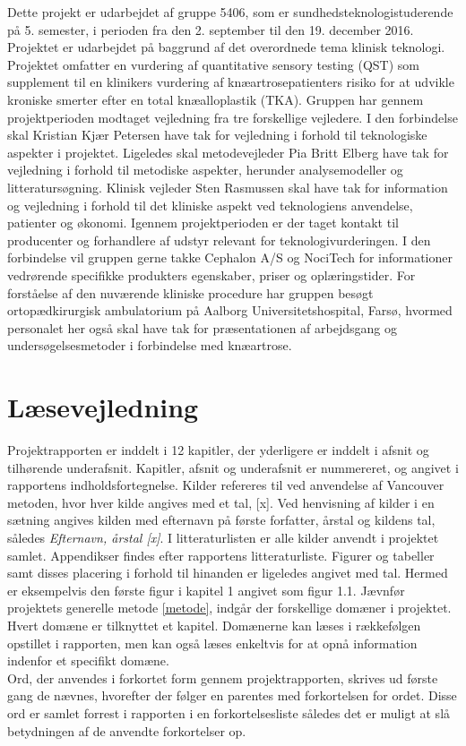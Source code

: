 Dette projekt er udarbejdet af gruppe 5406, som er sundhedsteknologistuderende på 5. semester, i perioden fra den 2. september til den 19. december 2016. Projektet er udarbejdet på baggrund af det overordnede tema klinisk teknologi. Projektet omfatter en vurdering af quantitative sensory testing (QST) som supplement til en klinikers vurdering af knæartrosepatienters risiko for at udvikle kroniske smerter efter en total knæalloplastik (TKA). Gruppen har gennem projektperioden modtaget vejledning fra tre forskellige vejledere. I den forbindelse skal Kristian Kjær Petersen have tak for vejledning i forhold til teknologiske aspekter i projektet. Ligeledes skal metodevejleder Pia Britt Elberg have tak for vejledning i forhold til metodiske aspekter, herunder analysemodeller og litteratursøgning. Klinisk vejleder Sten Rasmussen skal have tak for information og vejledning i forhold til det kliniske aspekt ved teknologiens anvendelse, patienter og økonomi. Igennem projektperioden er der taget kontakt til producenter og forhandlere af udstyr relevant for teknologivurderingen. I den forbindelse vil gruppen gerne takke Cephalon A/S og NociTech for informationer vedrørende specifikke produkters egenskaber, priser og oplæringstider. For forståelse af den nuværende kliniske procedure har gruppen besøgt ortopædkirurgisk ambulatorium på Aalborg Universitetshospital, Farsø, hvormed personalet her også skal have tak for præsentationen af arbejdsgang og undersøgelsesmetoder i forbindelse med knæartrose.


\section*{Læsevejledning}
Projektrapporten er inddelt i 12 kapitler, der yderligere er inddelt i afsnit og tilhørende underafsnit. Kapitler, afsnit og underafsnit er nummereret, og angivet i rapportens indholdsfortegnelse. Kilder refereres til ved anvendelse af Vancouver metoden, hvor hver kilde angives med et tal, [x]. Ved henvisning af kilder i en sætning angives kilden med efternavn på første forfatter, årstal og kildens tal, således \textit{Efternavn, årstal [x]}. I litteraturlisten er alle kilder anvendt i projektet samlet. Appendikser findes efter rapportens litteraturliste.
Figurer og tabeller samt disses placering i forhold til hinanden er ligeledes angivet med tal. Hermed er eksempelvis den første figur i kapitel 1 angivet som figur 1.1. Jævnfør projektets generelle metode \ref{metode}, indgår der forskellige domæner i projektet. Hvert domæne er tilknyttet et kapitel. Domænerne kan læses i rækkefølgen opstillet i rapporten, men kan også læses enkeltvis for at opnå information indenfor et specifikt domæne.\\
Ord, der anvendes i forkortet form gennem projektrapporten, skrives ud første gang de nævnes, hvorefter der følger en parentes med forkortelsen for ordet. Disse ord er samlet forrest i rapporten i en forkortelsesliste således det er muligt at slå betydningen af de anvendte forkortelser op.